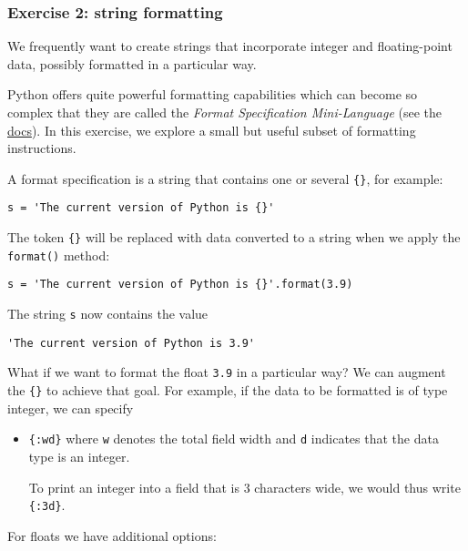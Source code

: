\documentclass[10pt]{scrartcl}
\begin{document}
    \hypertarget{exercise-2-string-formatting}{%
\subsubsection{Exercise 2: string
formatting}\label{exercise-2-string-formatting}}

We frequently want to create strings that incorporate integer and
floating-point data, possibly formatted in a particular way.

Python offers quite powerful formatting capabilities which can become so
complex that they are called the \emph{Format Specification
Mini-Language} (see the
\href{https://docs.python.org/3/library/string.html\#format-specification-mini-language}{docs}).
In this exercise, we explore a small but useful subset of formatting
instructions.

A format specification is a string that contains one or several
\texttt{\{\}}, for example:

\begin{verbatim}
s = 'The current version of Python is {}'
\end{verbatim}

The token \texttt{\{\}} will be replaced with data converted to a string
when we apply the \texttt{format()} method:

\begin{verbatim}
s = 'The current version of Python is {}'.format(3.9)
\end{verbatim}

The string \texttt{s} now contains the value

\begin{verbatim}
'The current version of Python is 3.9'
\end{verbatim}

What if we want to format the float \texttt{3.9} in a particular way? We
can augment the \texttt{\{\}} to achieve that goal. For example, if the
data to be formatted is of type integer, we can specify

\begin{itemize}
\item
  \texttt{\{:wd\}} where \texttt{w} denotes the total field width and
  \texttt{d} indicates that the data type is an integer.

  To print an integer into a field that is 3 characters wide, we would
  thus write \texttt{\{:3d\}}.
\end{itemize}

For floats we have additional options:
\end{document}
